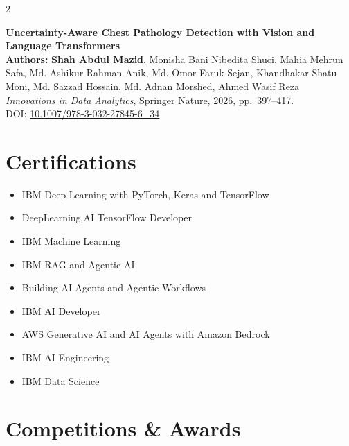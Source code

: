 \documentclass[10pt,a4paper]{article}
\begin{document}
\begin{multicols}{2}
\vspace{1mm}

\textbf{Uncertainty-Aware Chest Pathology Detection with Vision and Language Transformers}\\
\textbf{Authors:} \textbf{Shah Abdul Mazid}, Monisha Bani Nibedita Shuci, 
Mahia Mehrun Safa, Md. Ashikur Rahman Anik, Md. Omor Faruk Sejan, 
Khandhakar Shatu Moni, Md. Sazzad Hossain, Md. Adnan Morshed, Ahmed Wasif Reza\\[-0.5mm]
\textit{Innovations in Data Analytics}, Springer Nature, 2026, 
pp.~397--417.\\[-1mm]
DOI: \href{https://doi.org/10.1007/978-3-032-27845-6_34}
{10.1007/978-3-032-27845-6\_34}



\section{Certifications}

\begin{itemize}

\item IBM Deep Learning with PyTorch, Keras and TensorFlow

\item DeepLearning.AI TensorFlow Developer

\item IBM Machine Learning

\item IBM RAG and Agentic AI

\item Building AI Agents and Agentic Workflows

\item IBM AI Developer

\item AWS Generative AI and AI Agents with Amazon Bedrock

\item IBM AI Engineering

\item IBM Data Science

\end{itemize}


\section{Competitions \& Awards}


\end{multicols}
\end{document}

